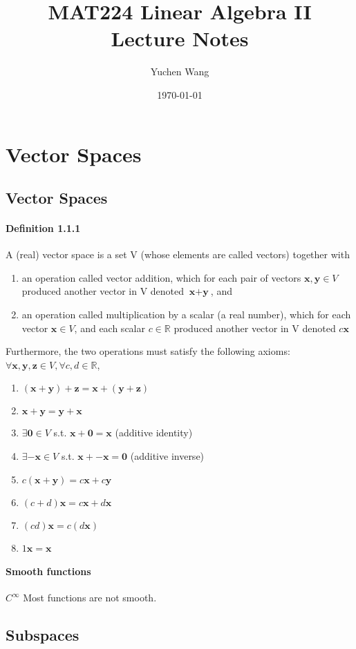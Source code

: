 \documentclass[11pt]{article}
\title{MAT224 Linear Algebra II \\ Lecture Notes}
\author{Yuchen Wang}
\date{\today}
\newcommand{\tb}[1]{\textbf{#1}}
\newcommand{\real}[0]{\mathbb{R}}
\newcommand{\vx}[0]{\tb{x}}
\newcommand{\vy}[0]{\tb{y}}
\newcommand{\vz}[0]{\tb{z}}
\newcommand{\vo}[0]{\tb{0}}
\begin{document}
	\maketitle
	\tableofcontents
	\newpage
	\section{Vector Spaces}
	\subsection{Vector Spaces}
	\paragraph{Definition 1.1.1} A (real) vector space is a set V (whose elements are called vectors) together with
	\begin{enumerate}
		\item an operation called vector addition, which for each pair of vectors $\vx, \vy \in V$ produced another vector in V denoted $\vx + \vy$, and
		\item an operation called multiplication by a scalar (a real number), which for each vector $\vx \in V$, and each scalar $c \in \real$ produced another vector in V denoted $c\vx$
	\end{enumerate}
	Furthermore, the two operations must satisfy the following axioms:
	$\forall \vx, \vy, \vz \in V, \forall c, d \in \real$,
	\begin{enumerate}
		\item $(\vx + \vy) + \vz = \vx + (\vy + \vz)$
		\item $\vx + \vy = \vy + \vx$
		\item $\exists \vo \in V$ s.t. $\vx + \vo = \vx$ (additive identity)
		\item $\exists -\vx \in V$ s.t. $\vx + -\vx = \vo$ (additive inverse)
		\item $c(\vx + \vy) = c\vx + c\vy$
		\item $(c + d)\vx = c\vx + d\vx$
		\item $(cd)\vx = c(d\vx)$
		\item $1\vx = \vx$
	\end{enumerate}
	\paragraph{Smooth functions}
	$C^\infty$ \newline
	Most functions are not smooth.
	\subsection{Subspaces}
\end{document}
